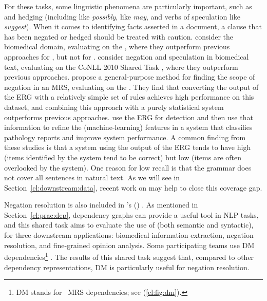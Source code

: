 \documentclass[output=paper,nonflat]{langsci/langscibook}
\begin{document}
For these tasks, some linguistic phenomena are particularly important,
such as  and hedging
(including  like \textit{possibly},  like \textit{may}, and verbs of speculation like \textit{suggest}).
When it comes to identifying facts asserted in a document,
a clause that has been negated or hedged should be treated with caution.
\citet{mackinlay2012biomed} consider the biomedical domain,
evaluating on the  \citep{kim2009task},
where they outperform previous approaches for , but not for .
\citet{velldal2012specneg} consider negation and speculation in biomedical text,
evaluating on the CoNLL 2010 Shared Task \citep{farkas2010task},
where they outperform previous approaches.
\citet{packard2014neg} propose a general-purpose method for finding the scope of negation in an MRS,
evaluating on the  \citep{morante2012task}.
They find that converting the output of the ERG with a relatively simple set of rules
achieves high performance on this  dataset,
and combining this approach with a purely statistical system
outperforms previous approaches.
\citet{zamaraeva2018pathology} use the ERG for  detection and then
use that information to refine the (machine-learning) features in a 
system that classifies  pathology reports and improve system performance.
A common finding from these studies
is that a system using the output of the ERG
tends to have high  (items identified by the system tend to be correct)
but low  (items are often overlooked by the system).
One reason for low recall is that the grammar does not cover all sentences in natural text.
As we will see in Section~\ref{cl:downstream:data},
recent work on  may help to close this coverage gap.

Negation resolution is also included in \citeauthor{oepen2017extrinsic}'s (\citeyear{oepen2017extrinsic})
.
As mentioned in Section~\ref{cl:prac:dep},
dependency graphs can provide a useful tool in NLP tasks,
and this shared task aims to evaluate the use of  (both semantic and syntactic),
for three downstream applications:
biomedical information extraction, negation resolution, and fine-grained opinion analysis.
Some participating teams use DM dependencies\footnote{DM stands for \delphin\ MRS dependencies; see (\ref{cl:fig:dm}).} \citep{schuster2017dep,chen2017dep}.
The results of this shared task suggest that,
compared to other dependency representations,
DM is particularly useful for negation resolution.
\end{document}
